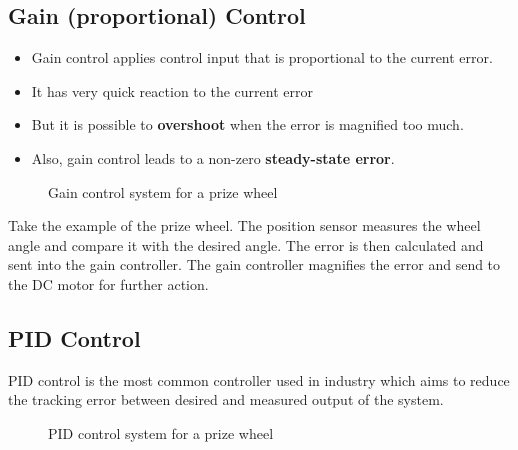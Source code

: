 \subsection{Gain (proportional) Control}
\begin{itemize}
    \item Gain control applies control input that is proportional to the current error.
    \item It has very quick reaction to the current error
    \item But it is possible to \textbf{overshoot} when the error is magnified too much.
    \item Also, gain control leads to a non-zero \textbf{steady-state error}.
\end{itemize}

\begin{figure}[H] 
    \centering 
    
    \caption{Gain control system for a prize wheel}
\end{figure}

Take the example of the prize wheel. The position sensor measures the wheel angle and compare it with the desired angle. The error is then calculated and sent into the gain controller. The gain controller magnifies the error and send to the DC motor for further action. 

\subsection{PID Control}
PID control is the most common controller used in industry which aims to reduce the tracking error between desired and measured output of the system.

\begin{figure}[H] 
    \centering 
    
    \caption{PID control system for a prize wheel}
\end{figure}

